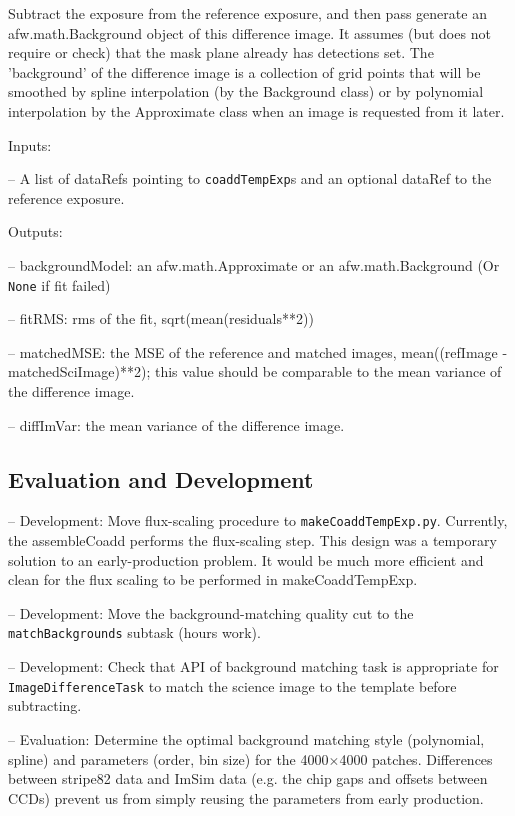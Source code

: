 \documentclass[prd, nofootinbib, floatfix, 11pt,tightenlines,times]{article}
\begin{document}
Subtract the exposure from the reference exposure, and then pass generate an afw.math.Background object of this difference image. It assumes (but does not require or check) that the mask plane already has detections set.  The 'background' of the difference image is a collection of grid points that will be smoothed by spline interpolation (by the Background class)  or by polynomial interpolation by the Approximate class when an image is requested from it later. 

Inputs: 

-- A list of dataRefs  pointing to {\tt coaddTempExp}s and an optional dataRef to the reference exposure. 

Outputs:  

-- backgroundModel: an afw.math.Approximate or an afw.math.Background (Or {\tt None} if fit failed) 

-- fitRMS: rms of the fit, sqrt(mean(residuals**2))

-- matchedMSE: the MSE of the reference and matched images, mean((refImage - matchedSciImage)**2); 
   this value should be comparable to the mean variance of the difference image.

-- diffImVar: the mean variance of the difference image.


\subsection{Evaluation and Development}

-- Development: Move flux-scaling procedure to {\tt makeCoaddTempExp.py}.  Currently, the assembleCoadd performs the flux-scaling step. This design was a temporary solution to an early-production problem.  It would be much more efficient and clean for the flux scaling to be performed in makeCoaddTempExp.

-- Development:  Move the background-matching quality cut to the {\tt matchBackgrounds} subtask (hours work).

-- Development:  Check that API of background matching task is appropriate for {\tt ImageDifferenceTask} to match the science image to the template before subtracting. 

-- Evaluation: Determine the optimal background matching style (polynomial, spline) and parameters (order, bin size) for the 4000$\times$4000 patches. Differences between stripe82 data and ImSim data (e.g. the chip gaps and offsets between CCDs) prevent us from simply reusing the parameters from early production.
\end{document}
